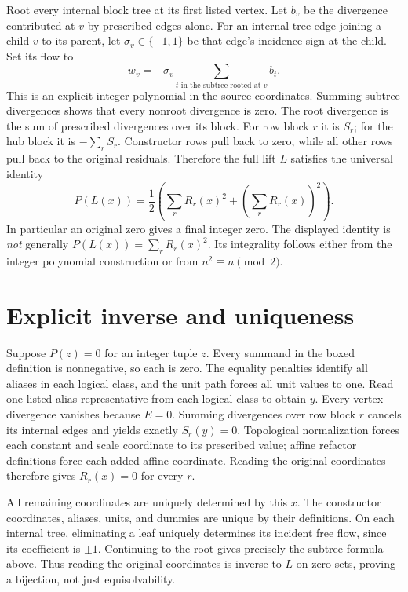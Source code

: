 Root every internal block tree at its first listed vertex. Let \(b_v\)
be the divergence contributed at \(v\) by prescribed edges alone.
For an internal tree edge joining a child \(v\) to its parent, let
\(\sigma_v\in\{-1,1\}\) be that edge's incidence sign at the child.
Set its flow to
\[
 w_v=-\sigma_v\sum_{t\text{ in the subtree rooted at }v}b_t.
\]
This is an explicit integer polynomial in the source coordinates. Summing
subtree divergences shows that every nonroot divergence is zero. The
root divergence is the sum of prescribed divergences over its block.
For row block \(r\) it is \(S_r\); for the hub block it is
\(-\sum_rS_r\). Constructor rows pull back to zero, while all other
rows pull back to the original residuals. Therefore the full lift \(L\)
satisfies the universal identity
\[
 P(L(x))=\frac12\left(\sum_rR_r(x)^2+
                                \left(\sum_rR_r(x)\right)^2\right).
\]
In particular an original zero gives a final integer zero. The displayed
identity is \emph{not} generally \(P(L(x))=\sum_rR_r(x)^2\).
Its integrality follows either from the integer polynomial construction
or from \(n^2\equiv n\pmod2\).

\section{Explicit inverse and uniqueness}
Suppose \(P(z)=0\) for an integer tuple \(z\). Every summand in the
boxed definition is nonnegative, so each is zero. The equality penalties
identify all aliases in each logical class, and the unit path forces all
unit values to one. Read one listed alias representative from each
logical class to obtain \(y\). Every vertex divergence vanishes because
\(E=0\). Summing divergences over row block \(r\) cancels its internal
edges and yields exactly \(S_r(y)=0\). Topological normalization forces
each constant and scale coordinate to its prescribed value; affine
refactor definitions force each added affine coordinate. Reading the
original coordinates therefore gives \(R_r(x)=0\) for every \(r\).

All remaining coordinates are uniquely determined by this \(x\). The
constructor coordinates, aliases, units, and dummies are unique by their
definitions. On each internal tree, eliminating a leaf uniquely determines
its incident free flow, since its coefficient is \(\pm1\). Continuing
to the root gives precisely the subtree formula above. Thus reading the
original coordinates is inverse to \(L\) on zero sets, proving a
bijection, not just equisolvability.


